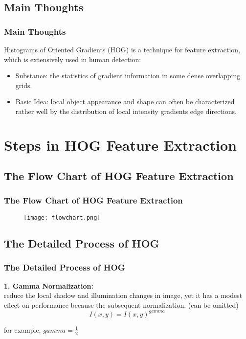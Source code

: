 \documentclass[notheorems,serif,table,compress]{beamer}  %
\begin{document}

\subsection{Main Thoughts}
\begin{frame}
\frametitle{Main Thoughts}
Histograms of Oriented Gradients (HOG) is a technique for feature extraction, which is extensively used in human detection:
    \begin{itemize}
        \item {\color{blue}Substance: }the statistics of gradient information in some dense overlapping grids.
        \item {\color{blue}Basic Idea: }local object appearance and shape can often be characterized rather well by the distribution of local intensity gradients edge directions.
    \end{itemize}
\end{frame}


\section{Steps in HOG Feature Extraction}

\subsection{The Flow Chart of HOG Feature Extraction}
\begin{frame}
\frametitle{The Flow Chart of HOG Feature Extraction}
\begin{figure}
    \texttt{[image: flowchart.png]} 
\end{figure}
\end{frame}
\subsection{The Detailed Process of HOG}
\begin{frame}
\frametitle{The Detailed Process of HOG}
\textbf{\color{blue}1. Gamma Normalization: } \\reduce the local shadow and illumination changes in image, yet it has a modest effect on performance because the subsequent normalization. (can be omitted)
\begin{displaymath}
I(x,y)=I(x,y)^{gamma}
\end{displaymath}
\begin{center}
for example, $gamma=\frac{1}{2}$
\end{center}
\end{frame}
\end{document}
